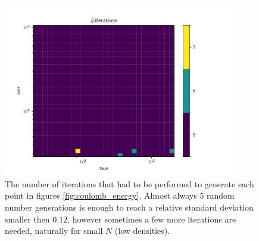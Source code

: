 \begin{figure}
	\begin{center}
		\includegraphics[width=0.9\textwidth]{graphics/coulomb_energy_example@iterations.pdf}
	\end{center}
	\caption{The number of iterations that had to be performed to generate each point in figures \ref{fig:coulomb_energy}. Almost always 5 random number generations is enough to reach a relative standard deviation smaller then $0.12$, however sometimes a few more iterations are needed, naturally for small $N$ (low densities).}
	\label{fig:coulomb_energy_iterations}
\end{figure}

